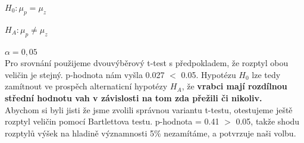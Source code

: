 \documentclass[12pt,a4paper]{article}
\begin{document}
$H_0: \mu_p = \mu_z$

$H_A: \mu_p \neq \mu_z$

$\alpha = 0,05$\\

Pro srovnání použijeme dvouvýběrový t-test s předpokladem, že rozptyl obou veličin je stejný. p-hodnota nám vyšla 0.027 $<$ 0.05. Hypotézu $H_0$ lze tedy zamítnout ve prospěch alternaticní hypotézy $H_A$, že \textbf{vrabci mají rozdílnou střední hodnotu vah v závislosti na tom zda přežili či nikoliv.} \\

Abychom si byli jisti že jsme zvolili správnou variantu t-testu, otestujeme ještě rozptyl veličin pomocí Bartlettova testu. p-hodnota = 0.41 $>$ 0.05, takže shodu rozptylů výšek na hladině významnosti 5\% nezamítáme, a potvrzuje naši volbu.
\end{document}
